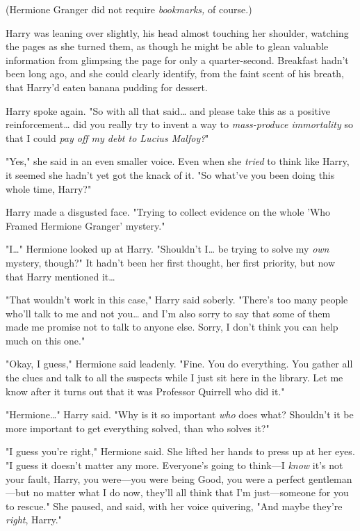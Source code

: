 (Hermione Granger did not require \emph{bookmarks,} of course.)

Harry was leaning over slightly, his head almost touching her shoulder, 
watching the pages as she turned them, as though he might be able to glean 
valuable information from glimpsing the page for only a quarter-second. 
Breakfast hadn't been long ago, and she could clearly identify, from the faint 
scent of his breath, that Harry'd eaten banana pudding for dessert.

Harry spoke again. "So with all that said{\ldots} and please take this as a 
positive reinforcement{\ldots} did you really try to invent a way to 
\emph{mass-produce immortality} so that I could \emph{pay off my debt to Lucius 
Malfoy?}"

"Yes," she said in an even smaller voice. Even when she \emph{tried} to think 
like Harry, it seemed she hadn't yet got the knack of it. "So what've you been 
doing this whole time, Harry?"

Harry made a disgusted face. "Trying to collect evidence on the whole 'Who 
Framed Hermione Granger' mystery."

"I{\ldots}" Hermione looked up at Harry. "Shouldn't I{\ldots} be trying to 
solve my \emph{own} mystery, though?" It hadn't been her first thought, her 
first priority, but now that Harry mentioned it{\ldots}

"That wouldn't work in this case," Harry said soberly. "There's too many people 
who'll talk to me and not you{\ldots} and I'm also sorry to say that some of 
them made me promise not to talk to anyone else. Sorry, I don't think you can 
help much on this one."

"Okay, I guess," Hermione said leadenly. "Fine. You do everything. You gather 
all the clues and talk to all the suspects while I just sit here in the 
library. Let me know after it turns out that it was Professor Quirrell who did 
it."

"Hermione{\ldots}" Harry said. "Why is it so important \emph{who} does what? 
Shouldn't it be more important to get everything solved, than who solves it?"

"I guess you're right," Hermione said. She lifted her hands to press up at her 
eyes. "I guess it doesn't matter any more. Everyone's going to think---I 
\emph{know} it's not your fault, Harry, you were---you were being Good, you 
were a perfect gentleman---but no matter what I do now, they'll all think that 
I'm just---someone for you to rescue." She paused, and said, with her voice 
quivering, "And maybe they're \emph{right}, Harry."

